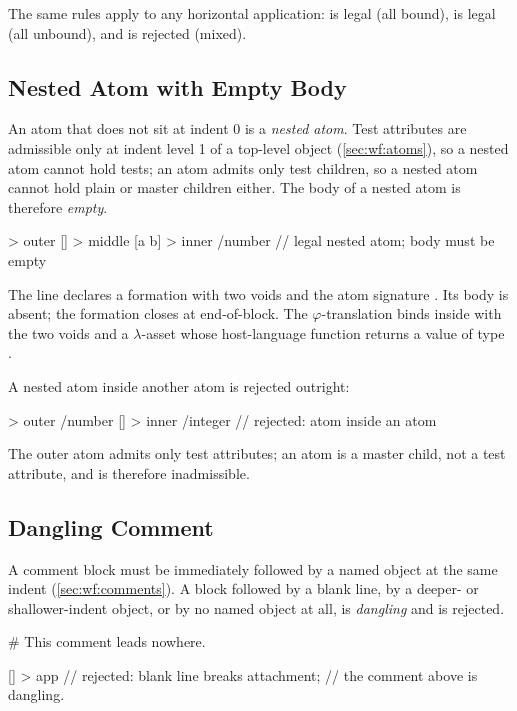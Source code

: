 The same rules apply to any horizontal application:
   is legal (all bound),  is legal (all
  unbound), and  is rejected (mixed).

\subsection{Nested Atom with Empty Body}\label{app:ex:nested-atom}

An atom that does not sit at indent 0 is a \emph{nested atom}.
Test attributes are admissible only at indent level 1 of a top-level
  object (\cref{sec:wf:atoms}), so a nested atom cannot hold tests;
  an atom admits only test children, so a nested atom cannot hold
  plain or master children either.
The body of a nested atom is therefore \emph{empty}.

\begin{ffcode}
[] > outer
  [] > middle
    [a b] > inner /number   // legal nested atom; body must be empty
\end{ffcode}

The line  declares a formation with two
  voids and the atom signature .
Its body is absent; the formation closes at end-of-block.
The \(\varphi\)-translation binds  inside  with
  the two voids and a \(\lambda\)-asset whose host-language function
  returns a value of type .

A nested atom inside another atom is rejected outright:

\begin{ffcode}
[] > outer /number
  [] > inner /integer       // rejected: atom inside an atom
\end{ffcode}

The outer atom admits only test attributes; an atom is a master child,
  not a test attribute, and is therefore inadmissible.

\subsection{Dangling Comment}\label{app:ex:dangling-comment}

A comment block must be immediately followed by a named object at the
  same indent (\cref{sec:wf:comments}).
A block followed by a blank line, by a deeper- or shallower-indent
  object, or by no named object at all, is \emph{dangling} and is
  rejected.

\begin{ffcode}
# This comment leads nowhere.

[] > app                     // rejected: blank line breaks attachment;
                             //   the comment above is dangling.
\end{ffcode}

